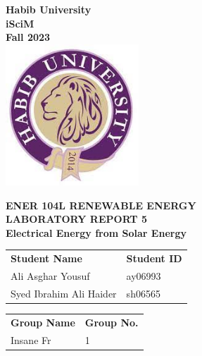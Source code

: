 \documentclass[a4paper, 12pt, english]{article}
\begin{document}
\begin{titlepage}
	\begin{center}
		\textbf{\LARGE Habib University}\\[0.5cm]
		\textbf{\large iSciM}\\[0.2cm]
		\textbf {\large Fall 2023}\\[0.2cm]
		\vspace{20pt}
		\includegraphics[width=5cm]{../habiblogo.jpg}\\[1cm]
		\par
		\vspace{20pt}
		\textbf{\Large ENER 104L RENEWABLE ENERGY}\\
		\vspace{15pt}
		\myrule[1pt][7pt]
		\textbf{\LARGE  LABORATORY REPORT 5}\\
		\vspace{15pt}
		\textbf{\large Electrical Energy from Solar Energy}\\
		\myrule[1pt][7pt]
		\vspace{25pt}
		\begin{tabular}{@{}p{5cm}p{3cm}@{}}
			\textbf{\large Student Name} & \textbf{\large Student ID} \\
			Ali Asghar Yousuf            & ay06993                    \\ %
			Syed Ibrahim Ali Haider      & sh06565                    \\ %
		\end{tabular}

		\vspace{10pt}
		\begin{tabular}{@{}p{5cm}p{3cm}@{}}
			\textbf{\large Group Name} & \textbf{\large Group No.} \\
			Insane Fr                  & 1                         \\
		\end{tabular}


\end{center}
\end{titlepage}
\end{document}
